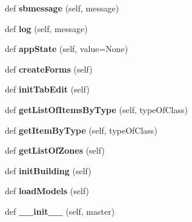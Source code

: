 \begin{DoxyCompactItemize}
\mbox{\label{class_no_m_a_s_s___g_u_i_1_1_app_abbb44567292dfd25cf04f480744f135b}} 
def {\bfseries sbmessage} (self, message)
\item 
\mbox{\label{class_no_m_a_s_s___g_u_i_1_1_app_afe04994f2e632d221eaa289759d85563}} 
def {\bfseries log} (self, message)
\item 
\mbox{\label{class_no_m_a_s_s___g_u_i_1_1_app_ad44749cbdce65f8f4bf1fb42c45619ad}} 
def {\bfseries app\+State} (self, value=None)
\item 
\mbox{\label{class_no_m_a_s_s___g_u_i_1_1_app_a0f36c6aaca21014bf6fc7dfc149bb698}} 
def {\bfseries create\+Forms} (self)
\item 
\mbox{\label{class_no_m_a_s_s___g_u_i_1_1_app_a614233114b7a6b341f08a2aec63f37d4}} 
def {\bfseries init\+Tab\+Edit} (self)
\item 
\mbox{\label{class_no_m_a_s_s___g_u_i_1_1_app_a1895c65df335fa1e8fd2a840e151df87}} 
def {\bfseries get\+List\+Of\+Items\+By\+Type} (self, type\+Of\+Class)
\item 
\mbox{\label{class_no_m_a_s_s___g_u_i_1_1_app_aa868dbc5bd188c9d8f1566315c50f93f}} 
def {\bfseries get\+Item\+By\+Type} (self, type\+Of\+Class)
\item 
\mbox{\label{class_no_m_a_s_s___g_u_i_1_1_app_a15f4a7deb315cc07fc0416efeeec2a4c}} 
def {\bfseries get\+List\+Of\+Zones} (self)
\item 
\mbox{\label{class_no_m_a_s_s___g_u_i_1_1_app_ab47bc403d1115957943f4173f6663bac}} 
def {\bfseries init\+Building} (self)
\item 
\mbox{\label{class_no_m_a_s_s___g_u_i_1_1_app_ac50dbff74d6e23f6c02d03bf7436825a}} 
def {\bfseries load\+Models} (self)
\item 
\mbox{\label{class_no_m_a_s_s___g_u_i_1_1_app_aa7a4e2c13d6198a41bbf8f878589394b}} 
def {\bfseries \+\_\+\+\_\+init\+\_\+\+\_\+} (self, master)
\end{DoxyCompactItemize}
